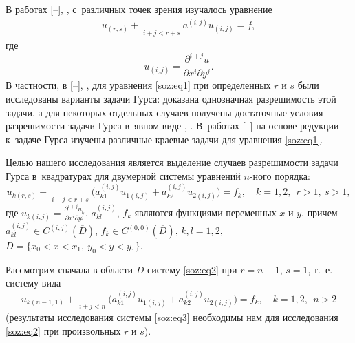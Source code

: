  В работах [--], \cite[гл.~3]{soz:bib:zhegalov}, \cite[гл.~1, 3]{soz:bib:zhegalov2} с~различных точек зрения изучалось уравнение
 \begin{equation}
\begin{array}{c}
u_{(r,s)}+\mathop{\sum\limits_{i=0}^{r}\sum\limits_{j=0}^{s}}\limits_{i + j < r+s} a^{(i,j)}u_{(i,j)}=f,
\end{array}
\label{soz:eq1}
\end{equation}
где 
$$u_{(i,j)}=\frac{\partial^{i+j}u}{\partial x^{i}\partial y^{j}}.$$
В частности, в [--], 
\cite[гл.~3]{soz:bib:zhegalov}, \cite[гл.~1]{soz:bib:zhegalov2} для уравнения \eqref{soz:eq1}  при определенных $r$ и $s$ были исследованы варианты задачи Гурса: 
доказана однозначная разрешимость этой задачи, а для некоторых отдельных случаев получены достаточные условия разрешимости  задачи Гурса в~явном виде \cite[гл.~3]{soz:bib:zhegalov}, \cite[гл.~3]{soz:bib:zhegalov2}. 
В~работах [--] на основе редукции к~задаче Гурса изучены различные краевые задачи для уравнения \eqref{soz:eq1}. 

Целью нашего исследования является выделение случаев разрешимости задачи Гурса в~квадратурах для двумерной системы уравнений $n$-ного порядка:
\begin{equation}
u_{k(r,s)}+\mathop{\sum\limits_{i=0}^{r}\sum\limits_{j=0}^{s}}\limits_{i + j < r+s} 
\bigl(a_{k1}^{(i,j)}u_{1(i,j)}+a_{k2}^{(i,j)}u_{2(i,j)}\bigr)=f_{k}, 
\quad 
k=1, 2,\ \ r>1,\ s>1,
\label{soz:eq2}
\end{equation}
где $\displaystyle u_{k(i,j)}=\frac{\partial^{i+j}u_{k}}{\partial x^{i}\partial y^{j}}$, $a_{kl}^{(i,j)}$, $ f_{k}$ являются функциями переменных $x$ и $y$, 
причем $ a_{kl}^{(i,j)}\in C^{(i,j)}(\overline{D})$, $f_{k}\in C^{(0,0)}(\overline{D})$,  $k, l=1, 2$,  $D=\{x_{0}<x<x_{1},\ y_{0}<y<y_{1}\}$.

\smallskip

\hypertarget{soz:p1}{}

Рассмотрим сначала в области $D$ систему \eqref{soz:eq2}  при $r=n-1$, $s=1$, т.~е. систему вида
\begin{equation}
u_{k(n-1, 1)}+\mathop{\sum\limits_{i=0}^{n-1}\sum\limits_{j=0}^{1}}\limits_{i + j < n} \bigl(a_{k1}^{(i,j)}u_{1(i,j)}+a_{k2}^{(i,j)}u_{2(i,j)}\bigr)=f_{k}, 
\quad 
k=1, 2,\ \ n>2
\label{soz:eq3}
\end{equation}
(результаты исследования системы \eqref{soz:eq3} необходимы нам для исследования \eqref{soz:eq2}  при произвольных $r$ и $s$).

